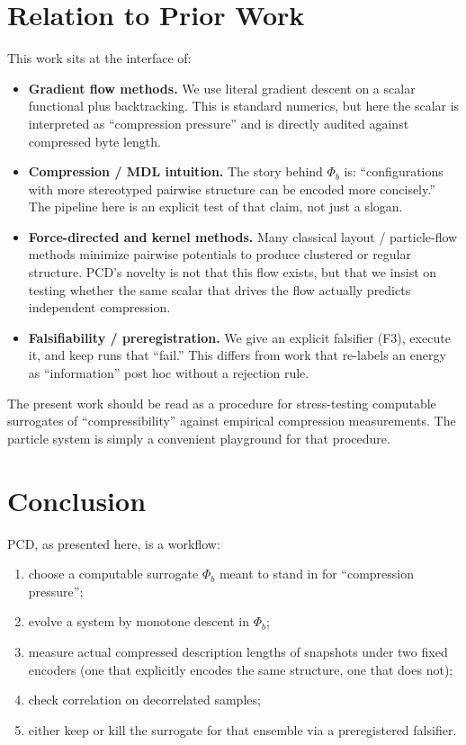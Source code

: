 \documentclass[11pt,a4paper]{article}
\numberwithin{equation}{section}
\newcommand{\phib}{\Phi_b}
\begin{document}
\section{Relation to Prior Work}
This work sits at the interface of:
\begin{itemize}
\item \textbf{Gradient flow methods.} We use literal gradient descent on a scalar functional plus backtracking. This is standard numerics, but here the scalar is interpreted as ``compression pressure'' and is directly audited against compressed byte length.
\item \textbf{Compression / MDL intuition.} The story behind $\phib$ is: ``configurations with more stereotyped pairwise structure can be encoded more concisely.'' The pipeline here is an explicit test of that claim, not just a slogan.
\item \textbf{Force-directed and kernel methods.} Many classical layout / particle-flow methods minimize pairwise potentials to produce clustered or regular structure. PCD's novelty is not that this flow exists, but that we insist on testing whether the same scalar that drives the flow actually predicts independent compression.
\item \textbf{Falsifiability / preregistration.} We give an explicit falsifier (F3), execute it, and keep runs that ``fail.'' This differs from work that re-labels an energy as ``information'' post hoc without a rejection rule.
\end{itemize}

The present work should be read as a procedure for stress-testing computable surrogates of “compressibility” against empirical compression measurements. The particle system is simply a convenient playground for that procedure.

\section{Conclusion}
PCD, as presented here, is a workflow:

\begin{enumerate}[label=(\arabic*)]
\item choose a computable surrogate $\phib$ meant to stand in for ``compression pressure'';
\item evolve a system by monotone descent in $\phib$;
\item measure actual compressed description lengths of snapshots under two fixed encoders (one that explicitly encodes the same structure, one that does not);
\item check correlation on decorrelated samples;
\item either keep or kill the surrogate for that ensemble via a preregistered falsifier.
\end{enumerate}
\end{document}
